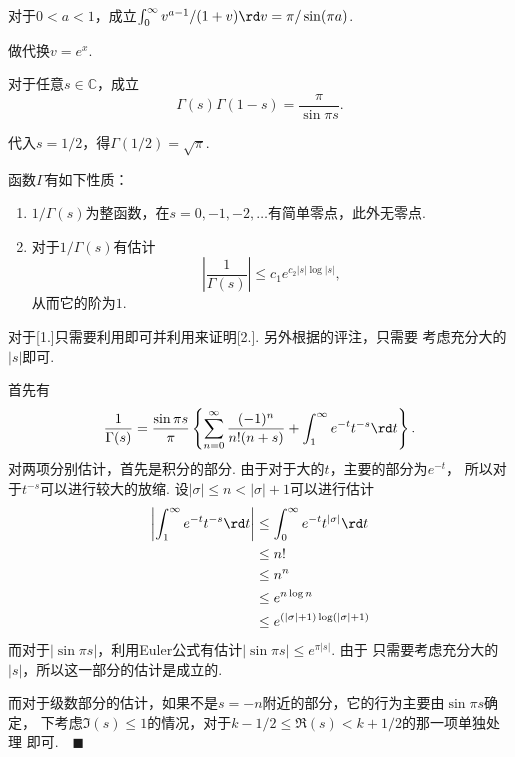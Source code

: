   \begin{lemma}
    对于$0<a<1$，成立$\int_0^\infty v^{a-1}/(1+v)\rd v = \pi/\sin(\pi a)$.
  \end{lemma}
  \proof
    做代换$v=e^x$.

  \begin{thm}[Gamma函数的对称性]
    \label{thm: Gamma函数的对称性}
    对于任意$s\in\mathbb{C}$，成立
    \[
      \Gamma(s)\Gamma(1-s) = \frac{\pi}{\sin\pi s}.
    \]
  \end{thm}
  \remark
    代入$s=1/2$，得$\Gamma(1/2)=\sqrt{\pi}$.

  \begin{thm}
    函数$\Gamma$有如下性质：
    \begin{enumerate}
      \item $1/\Gamma(s)$为整函数，在$s=0,-1,-2,\dots$有简单零点，此外无零点.
      \item 对于$1/\Gamma(s)$有估计
        \[
          \left|\frac{1}{\Gamma(s)}\right|\le c_1e^{c_2|s|\log|s|},
        \]
        从而它的阶为$1$.
    \end{enumerate}
  \end{thm}
  \proof
    对于[1.]只需要利用即可并利用来证明[2.]. 另外根据的评注，只需要
    考虑充分大的$|s|$即可.\par
    首先有
    \[
      \frac{1}{\Gamma(s)} = \frac{\sin \pi s}{\pi}
      \left\{\sum_{n=0}^\infty\frac{(-1)^n}{n!(n+s)}+
      \int_1^\infty e^{-t}t^{-s}\rd t\right\}.
    \]
    对两项分别估计，首先是积分的部分. 由于对于大的$t$，主要的部分为$e^{-t}$，
    所以对于$t^{-s}$可以进行较大的放缩. 设$|\sigma|\le n<|\sigma|+1$可以进行估计
    \[\begin{split}
      \left|\int_1^\infty e^{-t}t^{-s}\rd t\right|
      &\le \int_0^\infty e^{-t}t^{|\sigma|}\rd t \\
      &\le n! \\
      &\le n^n \\
      &\le e^{n\log n} \\
      &\le e^{(|\sigma|+1)\log(|\sigma|+1)}
    \end{split}\]
    而对于$|\sin\pi s|$，利用Euler公式有估计$|\sin\pi s|\le e^{\pi|s|}$. 由于
    只需要考虑充分大的$|s|$，所以这一部分的估计是成立的.\par
    而对于级数部分的估计，如果不是$s=-n$附近的部分，它的行为主要由$\sin\pi s$确定，
    下考虑$\Im(s)\le 1$的情况，对于$k-1/2\le \Re(s) < k+1/2$的那一项单独处理
    即可.$\quad\blacksquare$
  
